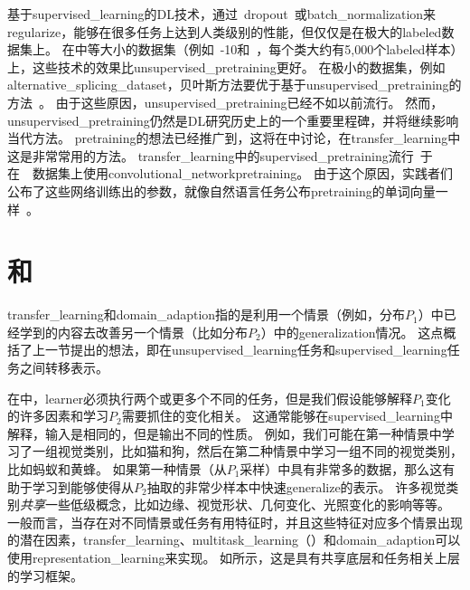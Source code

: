 

基于\gls{supervised_learning}的\gls{DL}技术，通过~\gls{dropout}~或\gls{batch_normalization}来\gls{regularize}，能够在很多任务上达到人类级别的性能，但仅仅是在极大的\gls{labeled}数据集上。
在中等大小的数据集（例如~-10和~，每个类大约有5,000个\gls{labeled}样本）上，这些技术的效果比\gls{unsupervised_pretraining}更好。
在极小的数据集，例如\gls{alternative_splicing_dataset}，贝叶斯方法要优于基于\gls{unsupervised_pretraining}的方法~\citep{Srivastava-master-small}。
由于这些原因，\gls{unsupervised_pretraining}已经不如以前流行。
然而，\gls{unsupervised_pretraining}仍然是\gls{DL}研究历史上的一个重要里程碑，并将继续影响当代方法。
\gls{pretraining}的想法已经推广到，这将在中讨论，在\gls{transfer_learning}中这是非常常用的方法。
\gls{transfer_learning}中的\gls{supervised_pretraining}流行~\citep{Oquab-et-al-CVPR2014,yosinski-nips2014}于在~~数据集上使用\gls{convolutional_network}\gls{pretraining}。
由于这个原因，实践者们公布了这些网络训练出的参数，就像自然语言任务公布\gls{pretraining}的单词向量一样~\citep{collobert2011natural,Mikolov-et-al-ICLR2013}。


\section{和}
\label{sec:transfer_learning_and_domain_adaptation}
\gls{transfer_learning}和\gls{domain_adaption}指的是利用一个情景（例如，分布$P_1$）中已经学到的内容去改善另一个情景（比如分布$P_2$）中的\gls{generalization}情况。
这点概括了上一节提出的想法，即在\gls{unsupervised_learning}任务和\gls{supervised_learning}任务之间转移表示。


在中，\gls{learner}必须执行两个或更多个不同的任务，但是我们假设能够解释$P_1$变化的许多因素和学习$P_2$需要抓住的变化相关。
这通常能够在\gls{supervised_learning}中解释，输入是相同的，但是输出不同的性质。
例如，我们可能在第一种情景中学习了一组视觉类别，比如猫和狗，然后在第二种情景中学习一组不同的视觉类别，比如蚂蚁和黄蜂。
如果第一种情景（从$P_1$采样）中具有非常多的数据，那么这有助于学习到能够使得从$P_2$抽取的非常少样本中快速\gls{generalize}的表示。%
许多视觉类别\emph{共享}一些低级概念，比如边缘、视觉形状、几何变化、光照变化的影响等等。
一般而言，当存在对不同情景或任务有用特征时，并且这些特征对应多个情景出现的潜在因素，\gls{transfer_learning}、\gls{multitask_learning}（）和\gls{domain_adaption}可以使用\gls{representation_learning}来实现。
如所示，这是具有共享底层和任务相关上层的学习框架。

